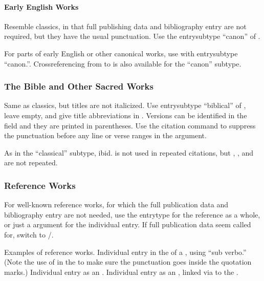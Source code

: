 \documentclass{ltxdockit}[2010/02/12]
\begin{document}
\paragraph{Early English Works}\label{earlyworks} Resemble classics, in that full publishing data and bibliography entry are not required, but they have the usual punctuation. Use the entrysubtype ``canon'' of . \autocites[][1.83]{miltonparadise-lost}

For parts of early English or other canonical works, use  with entrysubtype ``canon.''\autocites[][]{chaucerwife-of-baths-p}. Crossreferencing from  to  is also available for the ``canon'' subtype.\autocites{chaucerwife-of-baths-xref}

\subsubsection{The Bible and Other Sacred Works} Same as classics, but titles are not italicized. Use entrysubtype ``biblical'' of , leave  empty, and give title abbreviations in . Versions can be identified in the  field and they are printed in parentheses. Use the citation command  to suppress the punctuation before any line or verse ranges in the  argument. 

As in the ``classical'' subtype, ibid. is not used in repeated citations, but , , and  are not repeated.\autocites[][]{2-kings}

\subsubsection{Reference Works}
For well-known reference works, for which the full publication data and bibliography entry are not needed, use the entrytype  for the reference as a whole,  or just a  argument for the individual entry. If full publication data seem called for, switch to /.

Examples of reference works.\autocites[][]{1970dictionary-of-s, 1967brockhaus-enzyk}
Individual entry in the  of a , using ``sub verbo.''\autocites[][s.v. \mkbibquote{Veredeln}]{grimm1854deutsches-worte} (Note the use of  in the  to make sure the punctuation goes inside the quotation marks.)
Individual entry as an .\autocites[][]{huxley1878evolution-i}
Individual entry as an , linked via  to the .\autocites[][]{orel2008mendel-gregor}
\end{document}
